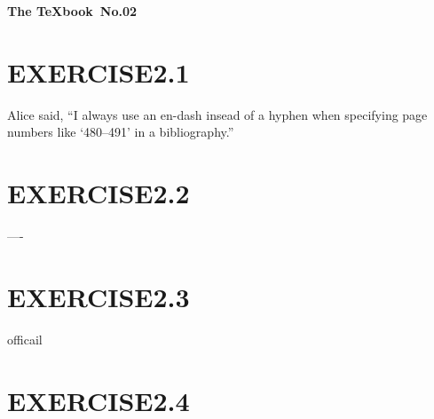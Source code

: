 \documentclass[leqno]{ltjsarticle}%
\begin{document}
\textbf{\LARGE{The \TeX book}\ \Large{No.02}}\hspace{\fill} 
\section*{EXERCISE2.1}
  Alice said, ``I always use an en-dash insead of a hyphen when specifying page numbers like `480--491' in a bibliography.''
\section*{EXERCISE2.2}
  ----  
\section*{EXERCISE2.3}
  officail
\section*{EXERCISE2.4}
\end{document}
